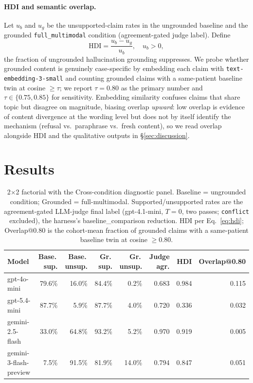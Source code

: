 \documentclass{article}
\theoremstyle{plain}
\begin{document}
\paragraph{HDI and semantic overlap.} Let $u_b$ and $u_g$ be the unsupported-claim rates in the ungrounded baseline and the grounded \texttt{full\_multimodal} condition (agreement-gated judge label). Define
\begin{equation}
\text{HDI} = \frac{u_b - u_g}{u_b}, \quad u_b > 0,
\label{eq:hdi}
\end{equation}
the fraction of ungrounded hallucination grounding suppresses. We probe whether grounded content is genuinely case-specific by embedding each claim with \texttt{text-embedding-3-small} \citep{openai2024embeddings} and counting grounded claims with a same-patient baseline twin at cosine $\geq \tau$; we report $\tau{=}0.80$ as the primary number and $\tau \in \{0.75, 0.85\}$ for sensitivity. Embedding similarity confuses claims that share topic but disagree on magnitude, biasing overlap \emph{upward}: low overlap is evidence of content divergence at the wording level but does not by itself identify the mechanism (refusal vs.\ paraphrase vs.\ fresh content), so we read overlap alongside HDI and the qualitative outputs in §\ref{sec:discussion}.

\section{Results}
\label{sec:results}

\begin{table}[!t]
\centering
\small
\begin{tabular}{lrrrrrrr}
\toprule
\textbf{Model} & \textbf{Base.\,sup.} & \textbf{Base.\,unsup.} & \textbf{Gr.\,sup.} & \textbf{Gr.\,unsup.} & \textbf{Judge agr.} & \textbf{HDI} & \textbf{Overlap@0.80} \\
\midrule
gpt-4o-mini             & 79.6\% & 16.0\% & 84.4\% & 0.2\%  & 0.683 & 0.984 & 0.115 \\
gpt-5.4-mini            & 87.7\% & 5.9\%  & 87.7\% & 4.0\%  & 0.720 & 0.336 & 0.032 \\
gemini-2.5-flash        & 33.0\% & 64.8\% & 93.2\% & 5.2\%  & 0.970 & 0.919 & 0.005 \\
gemini-3-flash-preview  & 7.5\%  & 91.5\% & 81.9\% & 14.0\% & 0.794 & 0.847 & 0.051 \\
\bottomrule
\end{tabular}
\caption{2$\times$2 factorial with the Cross-condition diagnostic panel. Baseline = ungrounded condition; Grounded = full-multimodal. Supported/unsupported rates are the agreement-gated LLM-judge final label (gpt-4.1-mini, $T{=}0$, two passes; \texttt{conflict} excluded), the harness's \textsf{baseline\_comparison} reduction. HDI per Eq.~\ref{eq:hdi}; Overlap@0.80 is the cohort-mean fraction of grounded claims with a same-patient baseline twin at cosine $\geq 0.80$.}
\label{tab:factorial}
\end{table}
\end{document}

